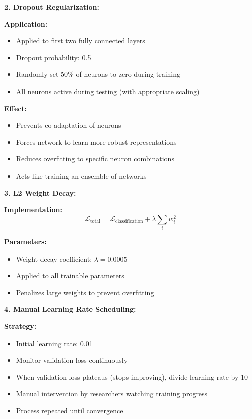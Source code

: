 \documentclass[12pt]{article}
\begin{document}
\begin{enumerate}[(a)]
{    \textbf{2. Dropout Regularization:}
    
    \textbf{Application:}
    \begin{itemize}
        \item Applied to first two fully connected layers
        \item Dropout probability: 0.5
        \item Randomly set 50\% of neurons to zero during training
        \item All neurons active during testing (with appropriate scaling)
    \end{itemize}
    
    \textbf{Effect:}
    \begin{itemize}
        \item Prevents co-adaptation of neurons
        \item Forces network to learn more robust representations
        \item Reduces overfitting to specific neuron combinations
        \item Acts like training an ensemble of networks
    \end{itemize}
    
    \textbf{3. L2 Weight Decay:}
    
    \textbf{Implementation:}
    $$\mathcal{L}_{\text{total}} = \mathcal{L}_{\text{classification}} + \lambda \sum_i w_i^2$$
    
    \textbf{Parameters:}
    \begin{itemize}
        \item Weight decay coefficient: $\lambda = 0.0005$
        \item Applied to all trainable parameters
        \item Penalizes large weights to prevent overfitting
    \end{itemize}
    
    \textbf{4. Manual Learning Rate Scheduling:}
    
    \textbf{Strategy:}
    \begin{itemize}
        \item Initial learning rate: 0.01
        \item Monitor validation loss continuously
        \item When validation loss plateaus (stops improving), divide learning rate by 10
        \item Manual intervention by researchers watching training progress
        \item Process repeated until convergence
    \end{itemize}
    
}
\end{enumerate}
\end{document}
